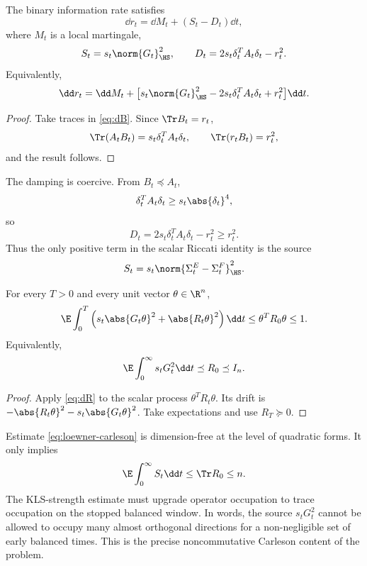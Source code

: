 \documentclass[../../main.tex]{subfiles}
\begin{document}
\begin{theorem}
\label{thm:scalar-riccati}
The binary information rate satisfies
\begin{equation}\label{eq:scalar-riccati}
  \dd r_t=\dd M_t+(S_t-D_t)\dd t,
\end{equation}
where $M_t$ is a local martingale,
\[
  S_t=s_t\norm{G_t}_{\HS}^2,
  \qquad
  D_t=2s_t\delta_t^TA_t\delta_t-r_t^2.
\]
Equivalently,
\begin{equation}\label{eq:scalar-riccati-expanded}
  \dd r_t=\dd M_t+\bigl[s_t\norm{G_t}_{\HS}^2-2s_t\delta_t^TA_t\delta_t+r_t^2\bigr]\dd t .
\end{equation}
\end{theorem}

\begin{proof}
Take traces in \eqref{eq:dB}. Since $\Tr B_t=r_t$,
\[
  \Tr(A_tB_t)=s_t\delta_t^TA_t\delta_t,
  \qquad
  \Tr(r_tB_t)=r_t^2,
\]
and the result follows.
\end{proof}

The damping is coercive. From $B_t\preceq A_t$,
\[
  \delta_t^TA_t\delta_t\ge s_t\abs{\delta_t}^4,
\]
so
\begin{equation}\label{eq:D-ge-r2}
  D_t=2s_t\delta_t^TA_t\delta_t-r_t^2\ge r_t^2 .
\end{equation}
Thus the only positive term in the scalar Riccati identity is the source
\[
  S_t=s_t\norm{\Sigma_t^E-\Sigma_t^F}_{\HS}^2.
\]

\begin{corollary}
\label{cor:per-direction}
For every $T>0$ and every unit vector $\theta\in\R^n$,
\begin{equation}\label{eq:per-direction}
  \E\int_0^T\left(s_t\abs{G_t\theta}^2+\abs{R_t\theta}^2\right)\dd t
  \le \theta^TR_0\theta\le1.
\end{equation}
Equivalently,
\begin{equation}\label{eq:loewner-carleson}
  \E\int_0^\infty s_tG_t^2\dd t\preceq R_0\preceq I_n.
\end{equation}
\end{corollary}

\begin{proof}
Apply \eqref{eq:dR} to the scalar process $\theta^TR_t\theta$. Its drift is
$-\abs{R_t\theta}^2-s_t\abs{G_t\theta}^2$. Take expectations and use $R_T\succeq0$.
\end{proof}

\begin{remark}
Estimate \eqref{eq:loewner-carleson} is dimension-free at the level of quadratic forms. It only
implies
\[
  \E\int_0^\infty S_t\dd t\le\Tr R_0\le n.
\]
The KLS-strength estimate must upgrade operator occupation to trace occupation on the stopped
balanced window. In words, the source $s_tG_t^2$ cannot be allowed to occupy many almost orthogonal
directions for a non-negligible set of early balanced times. This is the precise noncommutative
Carleson content of the problem.
\end{remark}
\end{document}
